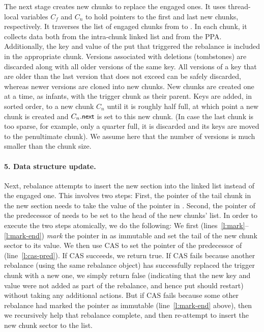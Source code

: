 The next stage creates new chunks to replace the engaged ones. 
It uses thread-local variables $C_f$ and  $C_n$  to hold pointers to the first and last new chunks, respectively.
It traverses the list of engaged chunks from  to .
In each chunk, it collects data both from the intra-chunk linked list and from the PPA. Additionally, 
the key and value of the put that triggered the rebalance is included in the appropriate chunk. 
Versions associated with deletions (tombstones) are discarded along with all older versions of the same key.
All versions of a key that are older than the last version that does not exceed  can be safely discarded, whereas
newer versions are cloned into new chunks. New chunks are created one at a time, as infants, with the trigger chunk as their parent.
Keys are added, in sorted order, to a new chunk $C_n$ until it is roughly half full, at which point a new chunk  is created
and $C_n.\code{next}$ is set to this new chunk. (In case the last chunk is too sparse, for example, only a quarter full, it is discarded and its keys are moved to the  penultimate chunk).
We assume here that the number of versions is much smaller than the chunk size.

\paragraph{5. Data structure update.}

Next, rebalance attempts to insert the new section into the linked list instead of the engaged one.
This involves two steps: First, the  pointer of the tail chunk in the new section needs to take the value of
the  pointer in . Second, the  pointer of the predecessor of  needs to be set to the head of
the new chunks' list. In order to execute the two steps atomically, we do the following:
We first (lines~\ref{l:mark}--\ref{l:mark-end}) \emph{mark} the  pointer in  as immutable and 
set the tail of the new chunk sector to its value. 
We then use CAS to set the  pointer of the predecessor of  (line~\ref{l:cas-pred}).
If CAS succeeds, we return true.
If CAS fails because another rebalance (using the same rebalance object) has successfully replaced the trigger chunk with a new one, we simply return false (indicating that the new key and value were not added as part of the rebalance, and hence put should restart) 
without taking any additional actions. But if CAS fails because some other rebalance had marked the  pointer as immutable (line~\ref{l:mark-end} above), then we recursively help that rebalance complete, and then re-attempt to insert the new chunk sector to the list.

